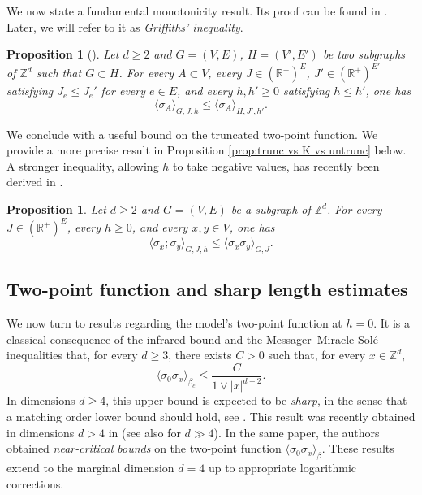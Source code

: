 \documentclass[10pt,a4paper]{amsart}
\numberwithin{equation}{section}
\newtheorem{Prop}[Thm]{Proposition}
\begin{document}
We now state a fundamental monotonicity result. Its proof can be found in \cite[Chapter~3]{FriedliVelenikIntroStatMech2017}. Later, we will refer to it as \emph{Griffiths' inequality}.

\begin{Prop}[]\label{prop:consequencegriffiths} Let $d\geq 2$ and $G=(V,E)$, $H=(V',E')$ be two subgraphs of $\mathbb Z^d$ such that $G\subset H$. For every $A\subset V$, every $J\in (\mathbb R^+)^E$, $J'\in (\mathbb R^+)^{E'}$ satisfying $J_e\leq J_e'$ for every $e\in E$, and every $h,h'\geq 0$ satisfying $h\leq h'$, one has
\begin{equation}\label{eq:monot Griffiths}
	\langle \sigma_A\rangle_{G,J,h}\leq \langle \sigma_A\rangle_{H,J',h'}.
\end{equation}
\end{Prop}
We conclude with a useful bound on the truncated two-point function. We provide a more precise result in Proposition \ref{prop:trunc vs K vs untrunc} below. A stronger inequality, allowing $h$ to take negative values, has recently been derived in \cite{Ding2023new}.
\begin{Prop}\label{prop: trunc is bounded by h=0} Let $d\geq 2$ and $G=(V,E)$ be a subgraph of $\mathbb Z^d$. For every $J\in (\mathbb R^+)^E$, every $h\geq 0$, and every $x,y\in V$, one has
\begin{equation}
	\langle \sigma_x;\sigma_y\rangle_{G,J,h}\leq \langle \sigma_x\sigma_y\rangle_{G,J}.
\end{equation}
\end{Prop}


\subsection{Two-point function and sharp length estimates}

We now turn to results regarding the model's two-point function at $h=0$. It is a classical consequence of the infrared bound and the Messager--Miracle-Sol\'e inequalities \cite{FrohlichSimonSpencerIRBounds1976,FrohlichIsraelLiebSimon1978,MessagerMiracleSoleInequalityIsing} that, for every $d\geq 3$, there exists $C>0$ such that, for every $x\in \mathbb Z^d$,
\begin{equation}\label{eq:IRB}
	\langle \sigma_0\sigma_x\rangle_{\beta_c}\leq \frac{C}{1\vee |x|^{d-2}}.
\end{equation}
In dimensions $d\geq 4$, this upper bound is expected to be \emph{sharp}, in the sense that a matching order lower bound should hold, see \cite{SladeTombergRGWeakPhi4in2016}. This result was recently obtained in dimensions $d>4$ in \cite{DuminilPanis2024newLB} (see also \cite{Sakai2007LaceExpIsing} for $d\gg 4$). In the same paper, the authors obtained \emph{near-critical bounds} on the two-point function $\langle \sigma_0\sigma_x\rangle_{\beta}$. These results extend to the marginal dimension $d=4$ up to appropriate logarithmic corrections. 
\end{document}
